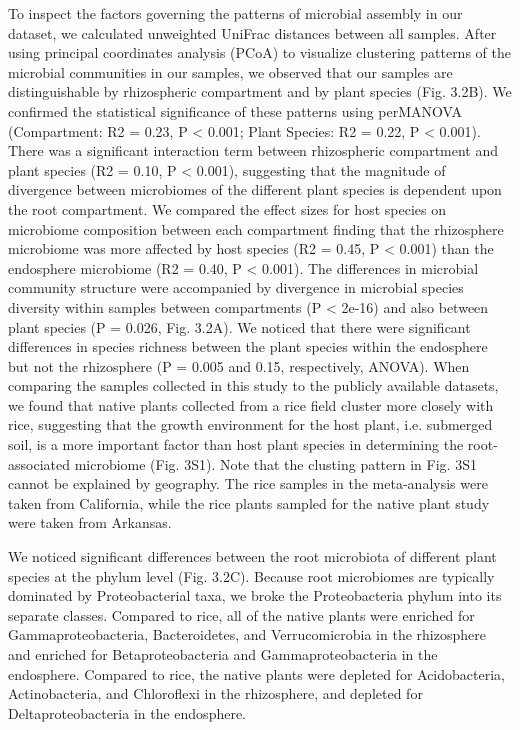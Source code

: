 To inspect the factors governing the patterns of microbial assembly in our dataset, we calculated unweighted UniFrac distances between all samples. After using principal coordinates analysis (PCoA) to visualize clustering patterns of the microbial communities in our samples, we observed that our samples are distinguishable by rhizospheric compartment and by plant species (Fig. 3.2B). We confirmed the statistical significance of these patterns using perMANOVA (Compartment: R2 = 0.23, P < 0.001; Plant Species: R2 = 0.22, P < 0.001). There was a significant interaction term between rhizospheric compartment and plant species (R2 = 0.10, P < 0.001), suggesting that the magnitude of divergence between microbiomes of the different plant species is dependent upon the root compartment. We compared the effect sizes for host species on microbiome composition between each compartment finding that the rhizosphere microbiome was more affected by host species (R2 = 0.45, P < 0.001) than the endosphere microbiome (R2 = 0.40, P < 0.001). The differences in microbial community structure were accompanied by divergence in microbial species diversity within samples between compartments (P < 2e-16) and also between plant species (P = 0.026, Fig. 3.2A). We noticed that there were significant differences in species richness between the plant species within the endosphere but not the rhizosphere (P = 0.005 and 0.15, respectively, ANOVA). When comparing the samples collected in this study to the publicly available datasets, we found that native plants collected from a rice field cluster more closely with rice, suggesting that the growth environment for the host plant, i.e. submerged soil, is a more important factor than host plant species in determining the root-associated microbiome (Fig. 3S1). Note that the clusting pattern in Fig. 3S1 cannot be explained by geography. The rice samples in the meta-analysis were taken from California, while the rice plants sampled for the native plant study were taken from Arkansas.

We noticed significant differences between the root microbiota of different plant species at the phylum level (Fig. 3.2C). Because root microbiomes are typically dominated by Proteobacterial taxa, we broke the Proteobacteria phylum into its separate classes. Compared to rice, all of the native plants were enriched for Gammaproteobacteria, Bacteroidetes, and Verrucomicrobia in the rhizosphere and enriched for Betaproteobacteria and Gammaproteobacteria in the endosphere. Compared to rice, the native plants were depleted for Acidobacteria, Actinobacteria, and Chloroflexi in the rhizosphere, and depleted for Deltaproteobacteria in the endosphere. 

